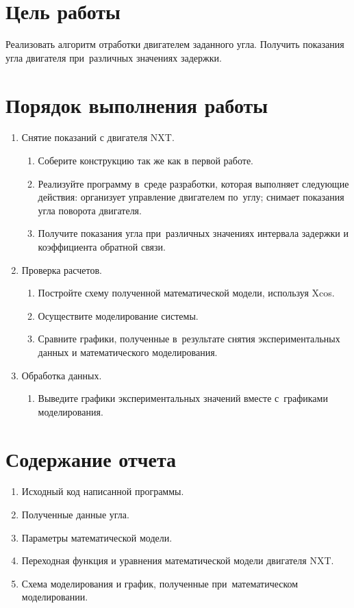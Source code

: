 \documentclass[12pt,a4paper,openany]{extarticle}
\begin{document}
\section{Цель работы}
Реализовать алгоритм отработки двигателем заданного угла. Получить показания угла двигателя при~различных значениях задержки.
\section{Порядок выполнения работы}
\begin{enumerate}
	\item Снятие показаний с двигателя NXT.
	\begin{enumerate}
		\item Соберите конструкцию так же как в первой работе.
		\item Реализуйте программу в~среде разработки, которая выполняет следующие действия: организует управление двигателем по~углу; снимает показания  угла поворота двигателя.
		\item Получите показания угла при~различных значениях интервала задержки и коэффициента обратной связи.
	\end{enumerate}
	\item Проверка расчетов.
	\begin{enumerate}
		\item Постройте схему полученной математической модели, используя Xcos.
		\item Осуществите моделирование системы.
		\item Сравните графики, полученные в~результате снятия экспериментальных данных и математического моделирования.
	\end{enumerate}
	\item Обработка данных.
	\begin{enumerate}
		\item Выведите графики экспериментальных значений вместе с~графиками моделирования.
	\end{enumerate}
\end{enumerate}
\section{Содержание отчета}
\begin{enumerate}
	\item Исходный код написанной программы.
	\item Полученные данные угла.
	\item Параметры математической модели.
	\item Переходная функция и уравнения математической модели двигателя NXT.
	\item Схема моделирования и график, полученные при~математическом моделировании.
\end{enumerate}
\end{document}
